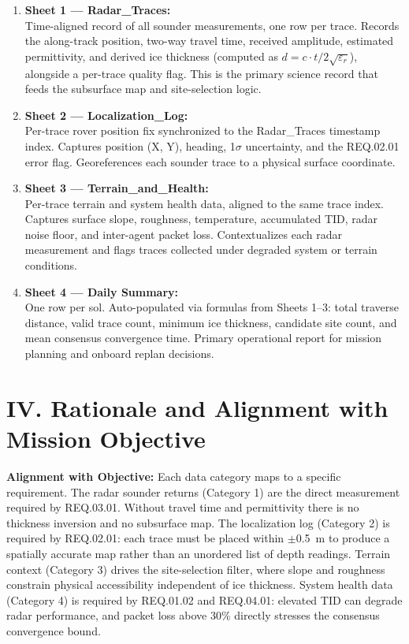 \documentclass[11pt]{article}
\begin{document}
\begin{enumerate}

    \item \textbf{Sheet 1 --- Radar\_Traces:}\\
    Time-aligned record of all sounder measurements, one row per trace. Records the
    along-track position, two-way travel time, received amplitude, estimated permittivity,
    and derived ice thickness (computed as $d = c \cdot t / 2\sqrt{\varepsilon_r}$), alongside
    a per-trace quality flag. This is the primary science record that feeds the
    subsurface map and site-selection logic.

    \item \textbf{Sheet 2 --- Localization\_Log:}\\
    Per-trace rover position fix synchronized to the Radar\_Traces timestamp index.
    Captures position (X, Y), heading, 1$\sigma$ uncertainty, and the REQ.02.01 error flag.
    Georeferences each sounder trace to a physical surface coordinate.

    \item \textbf{Sheet 3 --- Terrain\_and\_Health:}\\
    Per-trace terrain and system health data, aligned to the same trace index. Captures
    surface slope, roughness, temperature, accumulated TID, radar noise floor, and
    inter-agent packet loss. Contextualizes each radar measurement and flags traces
    collected under degraded system or terrain conditions.

    \item \textbf{Sheet 4 --- Daily Summary:}\\
    One row per sol. Auto-populated via formulas from Sheets 1--3: total traverse
    distance, valid trace count, minimum ice thickness, candidate site count, and mean
    consensus convergence time. Primary operational report for mission planning and
    onboard replan decisions.

\end{enumerate}


\section*{IV. Rationale and Alignment with Mission Objective}

\noindent\textbf{Alignment with Objective:}
Each data category maps to a specific requirement. The radar sounder returns (Category 1)
are the direct measurement required by REQ.03.01. Without travel time and permittivity
there is no thickness inversion and no subsurface map. The localization log (Category 2)
is required by REQ.02.01: each trace must be placed within $\pm$0.5~m to produce a
spatially accurate map rather than an unordered list of depth readings. Terrain context
(Category 3) drives the site-selection filter, where slope and roughness constrain physical
accessibility independent of ice thickness. System health data (Category 4) is required
by REQ.01.02 and REQ.04.01: elevated TID can degrade radar performance, and packet
loss above 30\% directly stresses the consensus convergence bound.
\end{document}

